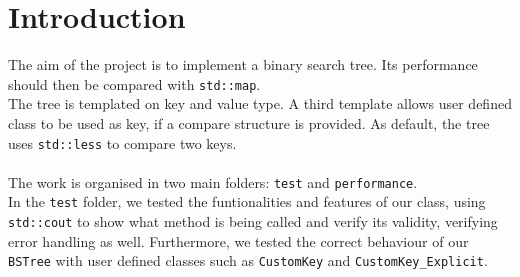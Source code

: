 \documentclass[12pt,a4paper,openany]{scrartcl}
\begin{document}
	
	\maketitle
	
	
\section{Introduction}
	The aim of the project is to implement a binary search tree. Its performance should then be compared with \texttt{std::map}.\\
    The tree is templated on key and value type. A third template allows user defined class to be used as key, if a compare structure is provided. As default, the tree uses \texttt{std::less} to compare two keys.\\\\
    The work is organised in two main folders: \texttt{test} and \texttt{performance}.\\
In the \texttt{test} folder, we tested the funtionalities and features of our class, using \texttt{std::cout} to show what method is being called and verify its validity, verifying error handling as well. Furthermore, we tested the correct behaviour of our \texttt{BSTree} with user defined classes such as \texttt{CustomKey} and \texttt{CustomKey\_Explicit}.
	
\end{document}
